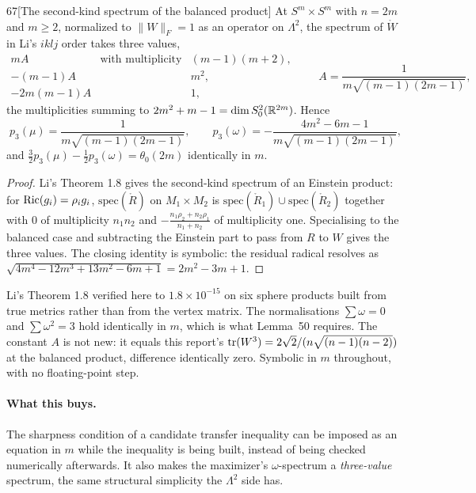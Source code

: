 \begin{Lem}{67}[The second-kind spectrum of the balanced product]
At $S^m\times S^m$ with $n=2m$ and $m\ge2$, normalized to $\|W\|_F=1$ as an operator on $\Lambda^2$, the spectrum of $\mathring W$ in Li's $iklj$ order takes three values,
\[
\begin{array}{lll}
mA & \text{with multiplicity} & (m-1)(m+2),\\
-(m-1)A & & m^2,\\
-2m(m-1)A & & 1,
\end{array}
\qquad A=\frac1{m\sqrt{(m-1)(2m-1)}},
\]
the multiplicities summing to $2m^2+m-1=\dim S^2_0(\mathbb{R}^{2m})$. Hence
\[
p_3(\mu)=\frac1{m\sqrt{(m-1)(2m-1)}},
\qquad
p_3(\omega)=-\frac{4m^2-6m-1}{m\sqrt{(m-1)(2m-1)}},
\]
and $\tfrac32p_3(\mu)-\tfrac12p_3(\omega)=\theta_0(2m)$ identically in $m$.
\end{Lem}

\begin{proof}
Li's Theorem 1.8 \cite{li2022} gives the second-kind spectrum of an Einstein product: for $\mathrm{Ric}(g_i)=\rho_ig_i$, $\mathrm{spec}(\mathring R)$ on $M_1\times M_2$ is $\mathrm{spec}(\mathring R_1)\cup\mathrm{spec}(\mathring R_2)$ together with $0$ of multiplicity $n_1n_2$ and $-\tfrac{n_1\rho_2+n_2\rho_1}{n_1+n_2}$ of multiplicity one. Specialising to the balanced case and subtracting the Einstein part to pass from $R$ to $W$ gives the three values. The closing identity is symbolic: the residual radical resolves as $\sqrt{4m^4-12m^3+13m^2-6m+1}=2m^2-3m+1$.
\end{proof}

\begin{certificate}
Li's Theorem 1.8 verified here to $1.8\times10^{-15}$ on six sphere products built from true metrics rather than from the vertex matrix. The normalisations $\sum\omega=0$ and $\sum\omega^2=3$ hold identically in $m$, which is what Lemma~50 requires. The constant $A$ is not new: it equals this report's $\operatorname{tr}(W^3)=2\sqrt2/(n\sqrt{(n-1)(n-2)})$ at the balanced product, difference identically zero. Symbolic in $m$ throughout, with no floating-point step.
\end{certificate}

\paragraph{What this buys.} The sharpness condition of a candidate transfer inequality can be imposed as an equation in $m$ while the inequality is being built, instead of being checked numerically afterwards. It also makes the maximizer's $\omega$-spectrum a \emph{three-value} spectrum, the same structural simplicity the $\Lambda^2$ side has.

